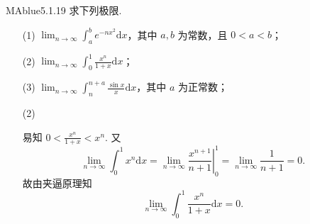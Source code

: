 \begin{problem}{MAblue}{5.1.19}
    求下列极限.
    \begin{enumerate}
        \item[(1)]
        $\displaystyle \lim_{n \to \infty} \int_a^b e^{-nx^2} \mathrm dx$，其中 $a, b$ 为常数，且 $0 < a < b$；
        \item[(2)]
        $\displaystyle \lim_{n \to \infty} \int_0^1 \frac{x^n}{1+x} \mathrm dx$；
        \item[(3)]
        $\displaystyle \lim_{n \to \infty} \int_n^{n+a} \frac {\sin x} x \mathrm dx$，其中 $a$ 为正常数；
    \end{enumerate}
\end{problem}

\begin{enumerate}
    \item[(2)]
    \begin{solution}
        易知 $0 < \frac{x^n}{1+x} < x^n$. 又
        \[
            \lim_{n \to \infty} \int_0^1 x^n \mathrm dx = \lim_{n \to \infty} \left. \frac{x^{n+1}}{n+1} \right|_0^1 = \lim_{n \to \infty} \frac 1 {n+1} = 0.
        \]
        故由夹逼原理知
        \[
            \lim_{n \to \infty} \int_0^1 \frac{x^n}{1+x} \mathrm dx = 0.
        \]
    \end{solution}
\end{enumerate}

